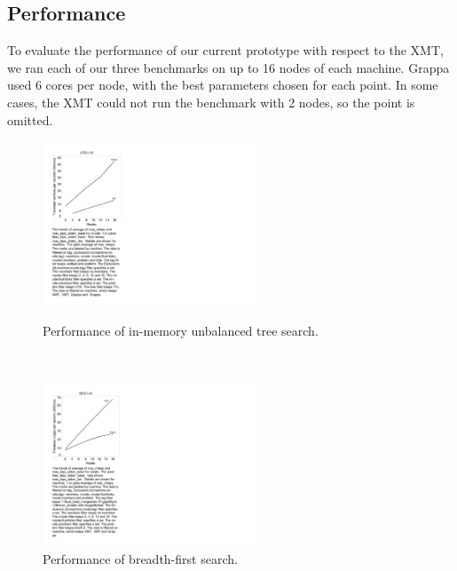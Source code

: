 \subsection{Performance}

To evaluate the performance of our current prototype with respect to the XMT,
we ran each of our three benchmarks on up to 16 nodes of each machine. Grappa
used 6 cores per node, with the best parameters chosen for each point. In some
cases, the XMT could not run the benchmark with 2 nodes, so the point is
omitted.

\begin{figure}
\begin{center}

\hspace{-1in}\begin{minipage}{0.3\textwidth}
\begin{center}
\includegraphics[width=2.5in]{figs/uts_performance.pdf}
\caption{\label{fig:uts_compare} Performance of in-memory unbalanced tree search.}
\end{center}
\end{minipage}
\hspace{1.25in}\
\begin{minipage}{0.3\textwidth}
\begin{center}
\includegraphics[width=2.5in]{figs/bfs_performance}
\caption{\label{fig:bfs-performance} Performance of breadth-first search.}
\end{center}
\end{minipage}

\end{center}
\end{figure}

